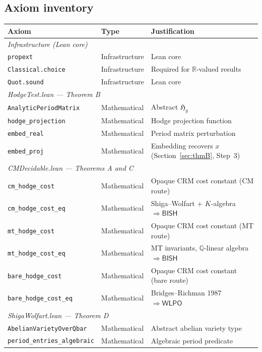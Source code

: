 \documentclass[11pt]{article}
\theoremstyle{plain}
\theoremstyle{definition}
\theoremstyle{remark}
\newcommand{\Q}{\mathbb{Q}}
\newcommand{\R}{\mathbb{R}}
\newcommand{\Hg}{\mathfrak{H}_g}
\newcommand{\BISH}{\ensuremath{\mathsf{BISH}}}
\newcommand{\WLPO}{\ensuremath{\mathsf{WLPO}}}
\begin{document}
\subsection{Axiom inventory}

\begin{center}
\begin{tabular}{lll}
\toprule
\textbf{Axiom} & \textbf{Type} & \textbf{Justification} \\
\midrule
\multicolumn{3}{l}{\emph{Infrastructure (Lean core)}} \\
\texttt{propext} & Infrastructure & Lean core \\
\texttt{Classical.choice} & Infrastructure & Required for $\R$-valued results \\
\texttt{Quot.sound} & Infrastructure & Lean core \\
\midrule
\multicolumn{3}{l}{\emph{HodgeTest.lean --- Theorem B}} \\
\texttt{AnalyticPeriodMatrix} & Mathematical & Abstract $\Hg$ \\
\texttt{hodge\_projection} & Mathematical & Hodge projection function \\
\texttt{embed\_real} & Mathematical & Period matrix perturbation \\
\texttt{embed\_proj} & Mathematical & Embedding recovers $x$ (Section~\ref{sec:thmB}, Step~3) \\
\midrule
\multicolumn{3}{l}{\emph{CMDecidable.lean --- Theorems A and C}} \\
\texttt{cm\_hodge\_cost} & Mathematical & Opaque CRM cost constant (CM route) \\
\texttt{cm\_hodge\_cost\_eq} & Mathematical & Shiga--Wolfart + $K$-algebra $\Rightarrow \BISH$ \\
\texttt{mt\_hodge\_cost} & Mathematical & Opaque CRM cost constant (MT route) \\
\texttt{mt\_hodge\_cost\_eq} & Mathematical & MT invariants, $\Q$-linear algebra $\Rightarrow \BISH$ \\
\texttt{bare\_hodge\_cost} & Mathematical & Opaque CRM cost constant (bare route) \\
\texttt{bare\_hodge\_cost\_eq} & Mathematical & Bridges--Richman 1987 $\Rightarrow \WLPO$ \\
\midrule
\multicolumn{3}{l}{\emph{ShigaWolfart.lean --- Theorem D}} \\
\texttt{AbelianVarietyOverQbar} & Mathematical & Abstract abelian variety type \\
\texttt{period\_entries\_algebraic} & Mathematical & Algebraic period predicate \\

\end{tabular}
\end{center}
\end{document}
